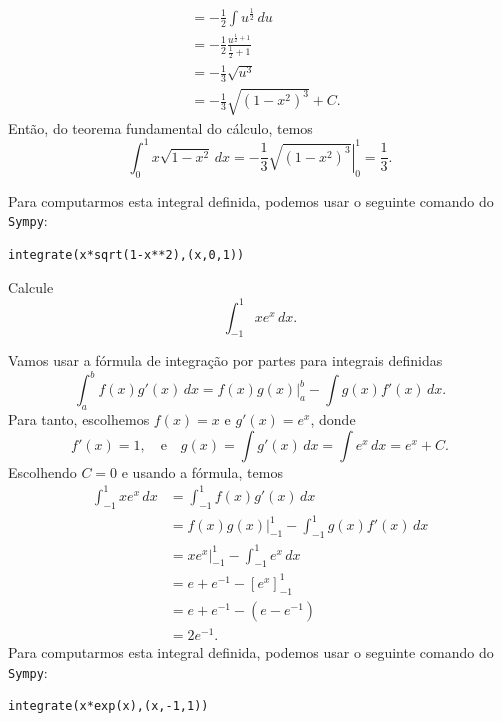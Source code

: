 \begin{resol}
\begin{itemize}
\begin{align}
                             &= -\frac{1}{2}\int u^{\frac{1}{2}}\,du\\
                             &= -\frac{1}{2}\frac{u^{\frac{1}{2}+1}}{\frac{1}{2}+1}\\
                             &= -\frac{1}{3}\sqrt{u^3}\\
                             &= -\frac{1}{3}\sqrt{(1-x^2)^3} + C.
    \end{align}
    Então, do teorema fundamental do cálculo, temos
    \begin{equation}
      \int_0^1 x\sqrt{1-x^2}\,dx = -\frac{1}{3}\left.\sqrt{(1-x^2)^3}\right|_{0}^1 = \frac{1}{3}.
    \end{equation}
  \end{itemize}

  \ifispython
  Para computarmos esta integral definida, podemos usar o seguinte comando do \verb+Sympy+:
\begin{verbatim}
integrate(x*sqrt(1-x**2),(x,0,1))
\end{verbatim}
  \fi
\end{resol}

\begin{exeresol}
  Calcule
  \begin{equation}
    \int_{-1}^1 xe^x\,dx.
  \end{equation}
\end{exeresol}
\begin{resol}
  Vamos usar a fórmula de integração por partes para integrais definidas
  \begin{equation}
    \int_a^b f(x)g'(x)\,dx = f(x)g(x)|_{a}^b - \int g(x)f'(x)\,dx.
  \end{equation}
  Para tanto, escolhemos $f(x) = x$ e $g'(x) = e^x$, donde
  \begin{equation}
    f'(x) = 1,\quad\text{e}\quad g(x) = \int g'(x)\,dx = \int e^x\,dx = e^x + C.
  \end{equation}
  Escolhendo $C=0$ e usando a fórmula, temos
  \begin{align}
    \int_{-1}^1 xe^x\,dx &= \int_{-1}^1 f(x)g'(x)\,dx\\
                         &= f(x)g(x)|_{-1}^1 - \int_{-1}^1 g(x)f'(x)\,dx\\
                         &= xe^x|_{-1}^1 - \int_{-1}^1 e^x\,dx\\
                         &= e+e^{-1}-[e^x]_{-1}^1\\
                         &= e+e^{-1}-(e-e^{-1})\\
                         &= 2e^{-1}.
  \end{align}
  \ifispython
  Para computarmos esta integral definida, podemos usar o seguinte comando do \verb+Sympy+:
\begin{verbatim}
integrate(x*exp(x),(x,-1,1))
\end{verbatim}
  \fi
\end{resol}

